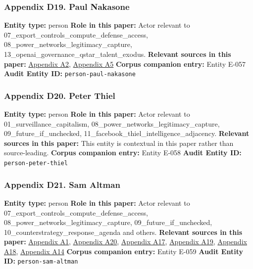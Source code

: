 \documentclass[
  american,
  11pt,
  letterpaper,
]{article}
\begin{document}
\subsubsection{Appendix D19. Paul
Nakasone}\label{appendix-d19-paul-nakasone}

\textbf{Entity type:} person \textbf{Role in this paper:} Actor relevant
to 07\_export\_controls\_compute\_defense\_access,
08\_power\_networks\_legitimacy\_capture,
13\_openai\_governance\_qstar\_talent\_exodus. \textbf{Relevant sources
in this paper:}
\hyperref[appendix-a2-openai-appoints-former-top-us-cyberwarrior-paul-nakasone-to-its-board-of-directors]{Appendix
A2},
\hyperref[appendix-a5-openai-board-forms-safety-and-security-committee]{Appendix
A5} \textbf{Corpus companion entry:} Entity E-057 \textbf{Audit Entity
ID:} \texttt{person-paul-nakasone}

\subsubsection{Appendix D20. Peter
Thiel}\label{appendix-d20-peter-thiel}

\textbf{Entity type:} person \textbf{Role in this paper:} Actor relevant
to 01\_surveillance\_capitalism,
08\_power\_networks\_legitimacy\_capture, 09\_future\_if\_unchecked,
11\_facebook\_thiel\_intelligence\_adjacency. \textbf{Relevant sources
in this paper:} This entity is contextual in this paper rather than
source-leading. \textbf{Corpus companion entry:} Entity E-058
\textbf{Audit Entity ID:} \texttt{person-peter-thiel}

\subsubsection{Appendix D21. Sam Altman}\label{appendix-d21-sam-altman}

\textbf{Entity type:} person \textbf{Role in this paper:} Actor relevant
to 07\_export\_controls\_compute\_defense\_access,
08\_power\_networks\_legitimacy\_capture, 09\_future\_if\_unchecked,
10\_counterstrategy\_response\_agenda and others. \textbf{Relevant
sources in this paper:}
\hyperref[appendix-a1-openai-announces-leadership-transition]{Appendix
A1},
\hyperref[appendix-a20-openais-proposals-for-the-us-ai-action-plan]{Appendix
A20}, \hyperref[appendix-a17-musk-v-altman-4-24-cv-04722]{Appendix A17},
\hyperref[appendix-a19-judge-denies-elon-musks-attempt-to-immediately-block-openais-conversion-to-for-profit-entity]{Appendix
A19},
\hyperref[appendix-a18-judge-denies-elon-musk-s-request-to-block-openai-for-profit-conversion-but-welcomes-trial]{Appendix
A18}, \hyperref[appendix-a14-sam-altman-s-manifest-destiny]{Appendix
A14} \textbf{Corpus companion entry:} Entity E-059 \textbf{Audit Entity
ID:} \texttt{person-sam-altman}
\end{document}
